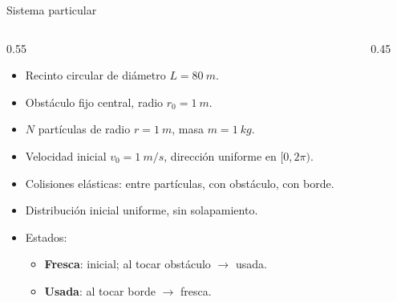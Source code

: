 \documentclass[10pt,aspectratio=169]{beamer}
\begin{document}
    \begin{frame}{Sistema particular}
        \begin{columns}[T]
            \begin{column}{0.55\textwidth}
                \begin{itemize}
                    \item Recinto circular de diámetro $L = \SI{80}{m}$.
                    \item Obstáculo fijo central, radio $r_0 = \SI{1}{m}$.
                    \item $N$ partículas de radio $r = \SI{1}{m}$, masa $m = \SI{1}{kg}$.
                    \item Velocidad inicial $v_0 = \SI{1}{m/s}$, dirección uniforme en $[0, 2\pi)$.
                    \item Colisiones elásticas: entre partículas, con obstáculo, con borde.
                    \item Distribución inicial uniforme, sin solapamiento.
                    \item Estados:
                    \begin{itemize}
                        \item \textcolor{green!55!black}{\textbf{Fresca}}: inicial; al tocar obstáculo $\to$ usada.
                        \item \textcolor{violet!70!black}{\textbf{Usada}}: al tocar borde $\to$ fresca.
                    \end{itemize}
                \end{itemize}
            \end{column}
            \begin{column}{0.45\textwidth}
                \centering
            \end{column}
        \end{columns}
    \end{frame}
\end{document}
